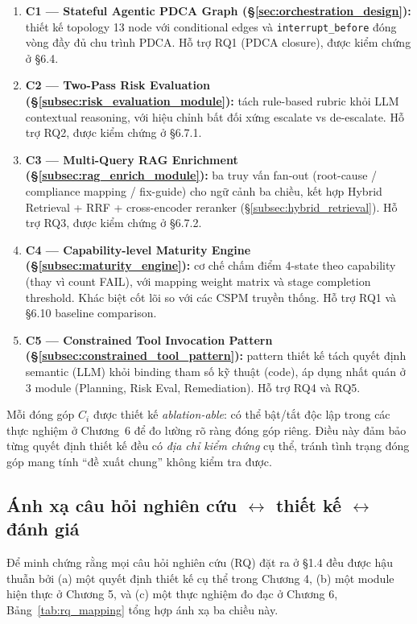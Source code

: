 \begin{enumerate}
  \item \textbf{C1 --- Stateful Agentic PDCA Graph (\S\ref{sec:orchestration_design}):} thiết kế topology 13 node với conditional edges và \texttt{interrupt\_before} đóng vòng đầy đủ chu trình PDCA. Hỗ trợ RQ1 (PDCA closure), được kiểm chứng ở \S{}6.4.
  \item \textbf{C2 --- Two-Pass Risk Evaluation (\S\ref{subsec:risk_evaluation_module}):} tách rule-based rubric khỏi LLM contextual reasoning, với hiệu chỉnh bất đối xứng escalate vs de-escalate. Hỗ trợ RQ2, được kiểm chứng ở \S{}6.7.1.
  \item \textbf{C3 --- Multi-Query RAG Enrichment (\S\ref{subsec:rag_enrich_module}):} ba truy vấn fan-out (root-cause / compliance mapping / fix-guide) cho ngữ cảnh ba chiều, kết hợp Hybrid Retrieval + RRF + cross-encoder reranker (\S\ref{subsec:hybrid_retrieval}). Hỗ trợ RQ3, được kiểm chứng ở \S{}6.7.2.
  \item \textbf{C4 --- Capability-level Maturity Engine (\S\ref{subsec:maturity_engine}):} cơ chế chấm điểm 4-state theo capability (thay vì count FAIL), với mapping weight matrix và stage completion threshold. Khác biệt cốt lõi so với các CSPM truyền thống. Hỗ trợ RQ1 và \S{}6.10 baseline comparison.
  \item \textbf{C5 --- Constrained Tool Invocation Pattern (\S\ref{subsec:constrained_tool_pattern}):} pattern thiết kế tách quyết định semantic (LLM) khỏi binding tham số kỹ thuật (code), áp dụng nhất quán ở 3 module (Planning, Risk Eval, Remediation). Hỗ trợ RQ4 và RQ5.
\end{enumerate}

Mỗi đóng góp $C_i$ được thiết kế \textit{ablation-able}: có thể bật/tắt độc lập trong các thực nghiệm ở Chương~6 để đo lường rõ ràng đóng góp riêng. Điều này đảm bảo từng quyết định thiết kế đều có \textit{địa chỉ kiểm chứng} cụ thể, tránh tình trạng đóng góp mang tính ``đề xuất chung'' không kiểm tra được.



\subsection{Ánh xạ câu hỏi nghiên cứu $\leftrightarrow$ thiết kế $\leftrightarrow$ đánh giá}
\label{sec:rq_design_eval_mapping}

Để minh chứng rằng mọi câu hỏi nghiên cứu (RQ) đặt ra ở §1.4 đều được hậu thuẫn bởi (a) một quyết định thiết kế cụ thể trong Chương 4, (b) một module hiện thực ở Chương 5, và (c) một thực nghiệm đo đạc ở Chương 6, Bảng~\ref{tab:rq_mapping} tổng hợp ánh xạ ba chiều này.

